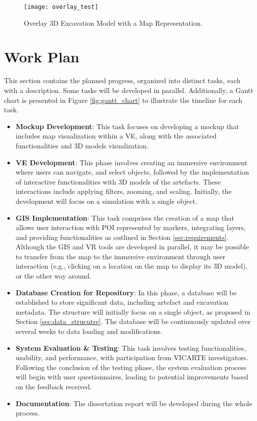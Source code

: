 \begin{figure}[h!]
    \centering
    \texttt{[image: overlay\_test]}
    \caption{Overlay \gls{3D} Excavation Model with a Map Representation.}
    \label{fig:overlay}
\end{figure}
\FloatBarrier


\section{Work Plan}
\label{cha:work_plan}

This section contains the planned progress, organized into distinct tasks, each with a description. Some tasks will be developed in parallel. 
Additionally, a Gantt chart is presented in Figure \ref{fig:gantt_chart} to illustrate the timeline for each task.

\begin{itemize}
    \item \textbf{Mockup Development}: This task focuses on developing a mockup that includes map visualization within a \gls{VE}, along with the associated functionalities and \gls{3D} models visualization.
    \item \textbf{\gls{VE} Development}: This phase involves creating an immersive environment where users can navigate, and select objects, followed by the implementation of interactive functionalities with \gls{3D} models of the artefacts. These interactions include applying filters, zooming, and scaling. Initially, the development will focus on a simulation with a single object.
    \item \textbf{\gls{GIS} Implementation}: This task comprises the creation of a map that allows user interaction with \gls{POI} represented by markers, integrating layers, and providing functionalities as outlined in Section \ref{sec:requirements}. Although the \gls{GIS} and \gls{VR} tools are developed in parallel, it may be possible to transfer from the map to the immersive environment through user interaction (e.g., clicking on a location on the map to display its \gls{3D} model), or the other way around.
    \item \textbf{Database Creation for Repository}: In this phase, a database will be established to store significant data, including artefact and excavation metadata. The structure will initially focus on a single object, as proposed in Section \ref{sec:data_strucutre}. The database will be continuously updated over several weeks to data loading and modifications.
    \item \textbf{System Evaluation \& Testing}: This task involves testing functionalities, usability, and performance, with participation from VICARTE investigators. Following the conclusion of the testing phase, the system evaluation process will begin with user questionnaires, leading to potential improvements based on the feedback received.  
    \item \textbf{Documentation}: The dissertation report will be developed during the whole process.
\end{itemize}

